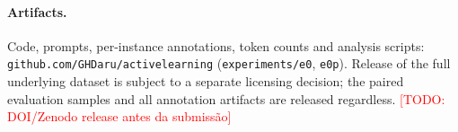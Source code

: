 \documentclass[11pt]{article}
\newcommand{\todo}[1]{\textcolor{red}{[TODO: #1]}}
\begin{document}
\paragraph{Artifacts.} Code, prompts, per-instance annotations, token
counts and analysis scripts: \texttt{github.com/GHDaru/activelearning}
(\texttt{experiments/e0}, \texttt{e0p}). Release of the full underlying
dataset is subject to a separate licensing decision; the paired evaluation
samples and all annotation artifacts are released regardless.
\todo{DOI/Zenodo release antes da submissão}



\end{document}
